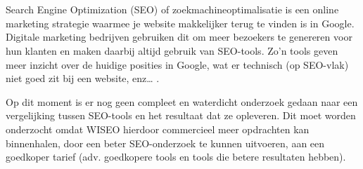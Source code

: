 
%
%

%



\chapter*{}

Search Engine Optimization (SEO) of zoekmachineoptimalisatie is een online marketing strategie waarmee je website makkelijker terug te vinden is in Google. Digitale marketing bedrijven gebruiken dit om meer bezoekers te genereren voor hun klanten en maken daarbij altijd gebruik van SEO-tools. Zo’n tools geven meer inzicht over de huidige posities in Google, wat er technisch (op SEO-vlak) niet goed zit bij een website, enz… .

Op dit moment is er nog geen compleet en waterdicht onderzoek gedaan naar een vergelijking tussen SEO-tools en het resultaat dat ze opleveren. Dit moet worden onderzocht omdat WISEO hierdoor commercieel meer opdrachten kan binnenhalen, door een beter SEO-onderzoek te kunnen uitvoeren, aan een goedkoper tarief (adv. goedkopere tools en tools die betere resultaten hebben). 

